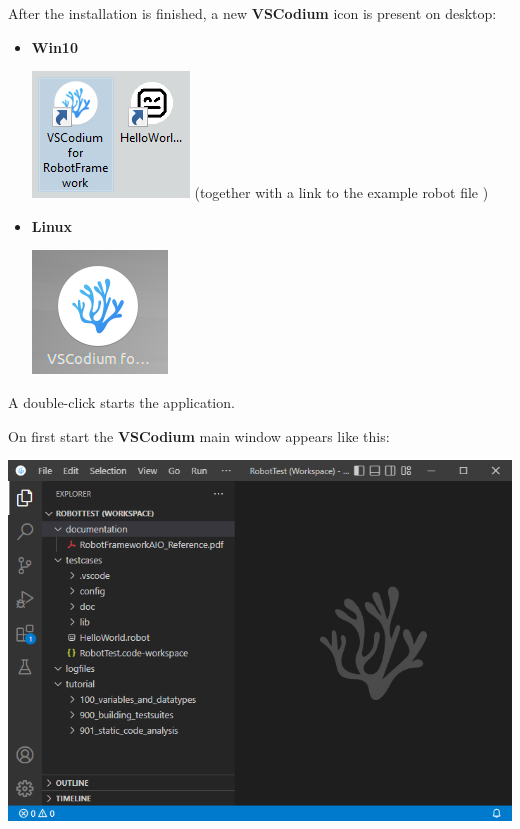 After the installation is finished, a new \textbf{VSCodium} icon is present on desktop:
\begin{itemize}
   \item \textbf{Win10}

         \includegraphics[scale=0.7]{./include/graphics/installation/Icon_Win10.png}
         (together with a link to the example robot file )

   \item \textbf{Linux}

         \includegraphics[scale=0.7]{./include/graphics/installation/Icon_Linux.png}
\end{itemize}

A double-click starts the application.

\newpage

On first start the \textbf{VSCodium} main window appears like this:

\includegraphics[scale=0.8]{./include/graphics/installation/MainWindow.png}

